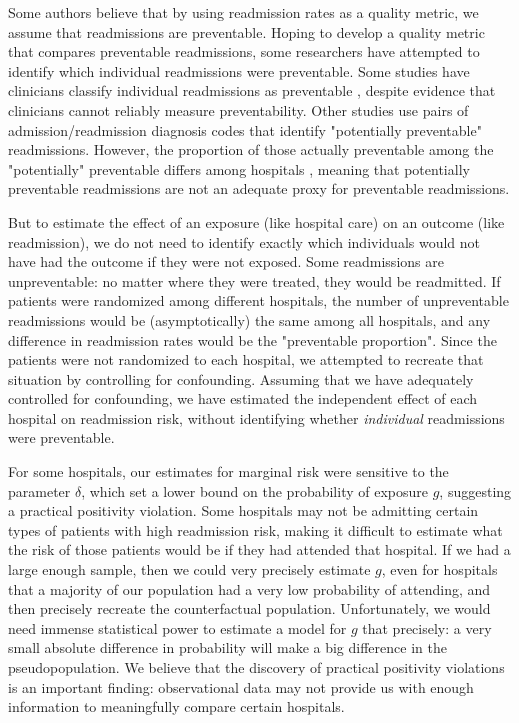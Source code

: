 \documentclass[]{article}\usepackage[]{graphicx}\usepackage[]{color}
\begin{document}
Some authors \supercite{kansagara_risk_2011, clarke_are_1990} believe that by using readmission rates as a quality metric, we assume that readmissions are preventable. Hoping to develop a quality metric that compares preventable readmissions, some researchers have attempted to identify which individual readmissions were preventable. Some studies have clinicians classify individual readmissions as preventable \supercite{witherington_communication_2008, stanley_review_2008, ruiz_factors_2008}, despite evidence that clinicians cannot reliably measure preventability.\supercite{van_walraven_incidence_2011} Other studies use pairs of admission/readmission diagnosis codes that identify "potentially preventable" readmissions.\supercite{halfon_validation_2006} However, the proportion of those actually preventable among the "potentially" preventable differs among hospitals \supercite{van_walraven_proportion_2011}, meaning that potentially preventable readmissions are not an adequate proxy for preventable readmissions.\supercite{clarke_are_1990}

But to estimate the effect of an exposure (like hospital care) on an outcome (like readmission), we do not need to identify exactly which individuals would not have had the outcome if they were not exposed.\supercite{hernan_causal_2014}  Some readmissions are unpreventable: no matter where they were treated, they would be readmitted. If patients were randomized among different hospitals, the number of unpreventable readmissions would be (asymptotically) the same among all hospitals, and any difference in readmission rates would be the "preventable proportion". Since the patients were not randomized to each hospital, we attempted to recreate that situation by controlling for confounding. Assuming that we have adequately controlled for confounding, we have estimated the independent effect of each hospital on readmission risk, without identifying whether \emph{individual} readmissions were preventable.

For some hospitals, our estimates for marginal risk were sensitive to the parameter $\delta$, which set a lower bound on the probability of exposure $g$, suggesting a practical positivity violation. Some hospitals may not be admitting certain types of patients with high readmission risk, making it difficult to estimate what the risk of those patients would be if they had attended that hospital.  If we had a large enough sample, then we could very precisely estimate $g$, even for hospitals that a majority of our population had a very low probability of attending, and then precisely recreate the counterfactual population. Unfortunately, we would need immense statistical power to estimate a model for $g$  that precisely: a very small absolute difference in probability will make a big difference in the pseudopopulation. We believe that the discovery of practical positivity violations is an important finding: observational data may not provide us with enough information to meaningfully compare certain hospitals.
\end{document}
